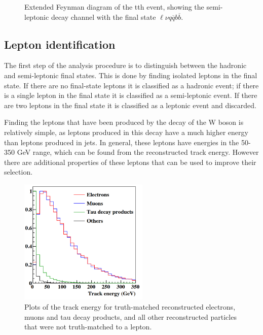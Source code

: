 \begin{figure}
	\caption{Extended Feynman diagram of the tth event, showing the semi-leptonic decay channel  with the final state $\ell\nu q\overline{q}b\overline{b}$.}
	\label{figure:physics/SM/feynman-tth-semileptonic}
\end{figure}

\subsection{Lepton identification}
The first step of the analysis procedure is to distinguish between the hadronic and semi-leptonic final states. This is done by finding isolated leptons in the final state. If there are no final-state leptons it is classified as a hadronic event; if there is a single lepton in the final state it is classified as a semi-leptonic event. If there are two leptons in the final state it is classified as a leptonic event and discarded.

Finding the leptons that have been produced by the decay of the W boson is relatively simple, as leptons produced in this decay have a much higher energy than leptons produced in jets. In general, these leptons have energies in the 50-350 GeV range, which can be found from the reconstructed track energy. However there are additional properties of these leptons that can be used to improve their selection.

\begin{figure}[h]
	\centering
	\includegraphics[width=0.55\textwidth]{../Pictures/Analysis/track-energy.png}
	\caption{Plots of the track energy for truth-matched reconstructed electrons, muons and tau decay products, and all other reconstructed particles that were not truth-matched to a lepton.}
	\label{figure:analysis/leptons/track-energy}
\end{figure}


